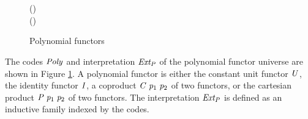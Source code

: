 \begin{figure}[t]
{\begin{minipage}{1\columnwidth}
\begin{hscode}
\\
\>[4]{}\<[6]%
\>[6]{}\<[25]%
\>[25]{}\mathbin{::}\;\to {}\;\;\<[E]%
\\
\>[4]{}\<[6]%
\>[6]{}\<[25]%
\>[25]{}\mathbin{::}\forall {}\hsforall {}\;(\;)\mathrel{=}\<[E]%
\\
\>[4]{}\<[6]%
\>[6]{}\<[25]%
\>[25]{}\mathbin{::}\forall {}\hsforall {}\;(\;)\mathrel{=}\<[E]%
\ColumnHook
\end{hscode}\resethooks
\end{minipage}
}
\caption{Polynomial functors}
\label{fig:polynomialuniverse}
\end{figure}

The codes \ensuremath{\Conid{Poly}} and interpretation \ensuremath{\Varid{Ext_{P}}} of the polynomial functor
universe are shown in Figure \ref{fig:polynomialuniverse}. A
polynomial functor is either the constant unit functor \ensuremath{\Conid{U}}, the
identity functor \ensuremath{\Conid{I}}, a coproduct \ensuremath{\Conid{C}\;\Varid{p}_{1}\;\Varid{p}_{2}} of two functors, or the
cartesian product \ensuremath{\Conid{P}\;\Varid{p}_{1}\;\Varid{p}_{2}} of two functors. The interpretation \ensuremath{\Varid{Ext_{P}}}
is defined as an inductive family indexed by the codes.


